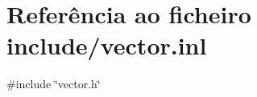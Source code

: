 \hypertarget{vector_8inl}{}\section{Referência ao ficheiro include/vector.inl}
\label{vector_8inl}
{\ttfamily \#include \char`\"{}vector.\+h\char`\"{}}\newline
